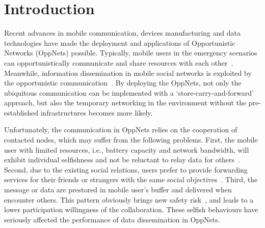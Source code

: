 \section{Introduction}
\label{sec:intro}
Recent advances in mobile communication,
devices manufacturing and data technologies have
made the deployment and applications of Opportunistic Networks
(OppNets) possible.
Typically,
mobile users in the emergency scenarios can
opportunistically communicate and share
resources with each other~\cite{DBLP:journals/tsc/KhalidKKZ14,
DBLP:journals/tmc/ChatzopoulosAKH18,
DBLP:journals/tmc/LiQJHW014}.
Meanwhile,
information dissemination 
in mobile social networks is exploited by
the opportunistic communication~\cite{DBLP:journals/tmc/HanHKMSS12}.
By deploying the OppNets,
not only the ubiquitous communication can be
implemented with a `store-carry-and-forward' approach,
but also the temporary networking
in the environment without the pre-established infrastructures
becomes more likely.

Unfortunately,
the communication in OppNets relies on
the cooperation of contacted nodes,
which may suffer from the following problems.
First,
the mobile user with limited resources,
i.e.,
battery capacity
and network bandwidth,
will exhibit individual selfishness and not be
reluctant to relay data for others~\cite{DBLP:journals/comsur/JedariXN18}.
Second,
due to the existing social relations,
users prefer to
provide forwarding services for their friends or strangers
with the same social objectives~\cite{DBLP:journals/tmc/HanHKMSS12}.
Third,
the message or data are prestored in mobile user's buffer 
and delivered when encounter others.
This pattern obviously brings new safety risk~\cite{Saha2018Design},
and leads to a lower participation willingness of the collaboration.
These selfish behaviours have seriously
affected the performance
of data dissemination in OppNets.



